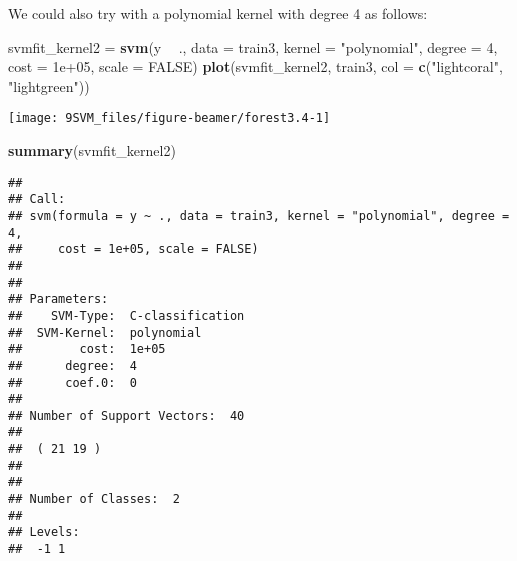 \documentclass[10pt,ignorenonframetext,]{beamer}
\newenvironment{Shaded}{\begin{snugshade}}{\end{snugshade}}
\newcommand{\DataTypeTok}[1]{\textcolor[rgb]{0.13,0.29,0.53}{#1}}
\newcommand{\DecValTok}[1]{\textcolor[rgb]{0.00,0.00,0.81}{#1}}
\newcommand{\FloatTok}[1]{\textcolor[rgb]{0.00,0.00,0.81}{#1}}
\newcommand{\KeywordTok}[1]{\textcolor[rgb]{0.13,0.29,0.53}{\textbf{#1}}}
\newcommand{\NormalTok}[1]{#1}
\newcommand{\OperatorTok}[1]{\textcolor[rgb]{0.81,0.36,0.00}{\textbf{#1}}}
\newcommand{\OtherTok}[1]{\textcolor[rgb]{0.56,0.35,0.01}{#1}}
\newcommand{\StringTok}[1]{\textcolor[rgb]{0.31,0.60,0.02}{#1}}
\begin{document}
\begin{frame}[fragile]

We could also try with a polynomial kernel with degree 4 as follows:

\scriptsize

\begin{Shaded}
\begin{Highlighting}[]
\NormalTok{svmfit_kernel2 =}\StringTok{ }\KeywordTok{svm}\NormalTok{(y }\OperatorTok{~}\StringTok{ }\NormalTok{., }\DataTypeTok{data =}\NormalTok{ train3, }\DataTypeTok{kernel =} \StringTok{"polynomial"}\NormalTok{, }\DataTypeTok{degree =} \DecValTok{4}\NormalTok{, }
    \DataTypeTok{cost =} \FloatTok{1e+05}\NormalTok{, }\DataTypeTok{scale =} \OtherTok{FALSE}\NormalTok{)}
\KeywordTok{plot}\NormalTok{(svmfit_kernel2, train3, }\DataTypeTok{col =} \KeywordTok{c}\NormalTok{(}\StringTok{"lightcoral"}\NormalTok{, }\StringTok{"lightgreen"}\NormalTok{))}
\end{Highlighting}
\end{Shaded}

\begin{center}\texttt{[image: 9SVM\_files/figure-beamer/forest3.4-1]} \end{center}

\end{frame}

\begin{frame}[fragile]

\scriptsize

\begin{Shaded}
\begin{Highlighting}[]
\KeywordTok{summary}\NormalTok{(svmfit_kernel2)}
\end{Highlighting}
\end{Shaded}

\begin{verbatim}
## 
## Call:
## svm(formula = y ~ ., data = train3, kernel = "polynomial", degree = 4, 
##     cost = 1e+05, scale = FALSE)
## 
## 
## Parameters:
##    SVM-Type:  C-classification 
##  SVM-Kernel:  polynomial 
##        cost:  1e+05 
##      degree:  4 
##      coef.0:  0 
## 
## Number of Support Vectors:  40
## 
##  ( 21 19 )
## 
## 
## Number of Classes:  2 
## 
## Levels: 
##  -1 1
\end{verbatim}

\end{frame}
\end{document}
